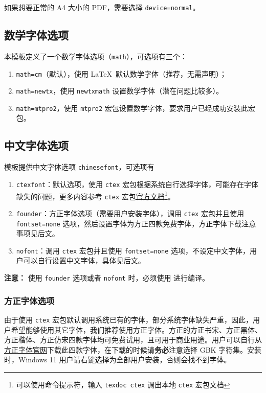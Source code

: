 \documentclass[cn,hazy,blue,14pt,screen]{elegantnote}
\begin{document}
\begin{note}
  如果想要正常的 A4 大小的 PDF，需要选择 \lstinline{device=normal}。
\end{note}


\subsection{数学字体选项}

本模板定义了一个数学字体选项（\lstinline{math}），可选项有三个：
\begin{enumerate}
  \item \lstinline{math=cm}（默认），使用 \LaTeX\ 默认数学字体（推荐，无需声明）；
  \item \lstinline{math=newtx}，使用 \lstinline{newtxmath} 设置数学字体（潜在问题比较多）。
  \item \lstinline{math=mtpro2}，使用 \lstinline{mtpro2} 宏包设置数学字体，要求用户已经成功安装此宏包。
\end{enumerate}


\subsection{中文字体选项}
模板提供中文字体选项 \lstinline{chinesefont}，可选项有
\begin{enumerate}
\item \lstinline{ctexfont}：默认选项，使用 \lstinline{ctex} 宏包根据系统自行选择字体，可能存在字体缺失的问题，更多内容参考 \lstinline{ctex} 宏包\href{https://ctan.org/pkg/ctex}{官方文档}\footnote{可以使用命令提示符，输入 \lstinline{texdoc ctex} 调出本地 \lstinline{ctex} 宏包文档}。
\item \lstinline{founder}：方正字体选项（需要用户安装字体），调用 \lstinline{ctex} 宏包并且使用 \lstinline{fontset=none} 选项，然后设置字体为方正四款免费字体，方正字体下载注意事项见后文。
\item \lstinline{nofont}：调用 \lstinline{ctex} 宏包并且使用 \lstinline{fontset=none} 选项，不设定中文字体，用户可以自行设置中文字体，具体见后文。
\end{enumerate}

\noindent \textbf{注意：} 使用 \lstinline{founder} 选项或者 \lstinline{nofont} 时，必须使用  进行编译。

\subsubsection{方正字体选项}
由于使用 \lstinline{ctex} 宏包默认调用系统已有的字体，部分系统字体缺失严重，因此，用户希望能够使用其它字体，我们推荐使用方正字体。方正的{\songti 方正书宋}、{\heiti 方正黑体}、{\kaishu 方正楷体}、{\fangsong 方正仿宋}四款字体均可免费试用，且可用于商业用途。用户可以自行从\href{http://www.foundertype.com/}{方正字体官网}下载此四款字体，在下载的时候请\textbf{务必}注意选择 GBK 字符集。安装时，{\kaishu Windows 11 用户请右键选择为全部用户安装，否则会找不到字体。}
\end{document}
